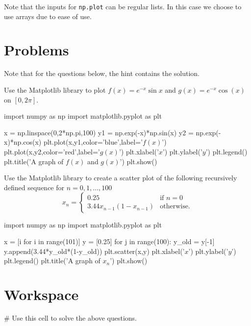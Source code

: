 \documentclass{ximera}
\begin{document}
Note that the inputs for \verb|np.plot| can be regular lists. In this case we choose to use arrays due to ease of use.

\section{Problems}

Note that for the questions below, the hint contains the solution.

\begin{question}
Use the Matplotlib library to plot $f(x)=e^{-x}\sin{x}$ and $g(x)=e^{-x}\cos(x)$ on $[0,2\pi]$.
	\begin{hint}
\begin{sageCell}
import numpy as np
import matplotlib.pyplot as plt

x = np.linspace(0,2*np.pi,100)
y1 = np.exp(-x)*np.sin(x)
y2 = np.exp(-x)*np.cos(x)
plt.plot(x,y1,color='blue',label='$f(x)$')
plt.plot(x,y2,color='red',label='$g(x)$')
plt.xlabel('$x$')
plt.ylabel('$y$')
plt.legend()
plt.title('A graph of $f(x)$ and $g(x)$')
plt.show()
\end{sageCell}
	\end{hint}
\end{question}

\begin{question}
Use the Matplotlib library to create a scatter plot of the following recursively defined sequence for $n=0,1,\dots,100$ $$x_n=\begin{cases}0.25 & \text{if $n=0$}\\ 3.44x_{n-1}(1-x_{n-1}) & \text{otherwise.}\end{cases}$$
	\begin{hint}
\begin{sageCell}
import numpy as np
import matplotlib.pyplot as plt

x = [i for i in range(101)]
y = [0.25]
for j in range(100):
	y_old = y[-1]
	y.append(3.44*y_old*(1-y_old))
plt.scatter(x,y)
plt.xlabel('$x$')
plt.ylabel('$y$')
plt.legend()
plt.title('A graph of $x_n$')
plt.show()
\end{sageCell}
	\end{hint}
\end{question}

\section{Workspace}

\begin{sageCell}
# Use this cell to solve the above questions.
\end{sageCell}
\end{document}
